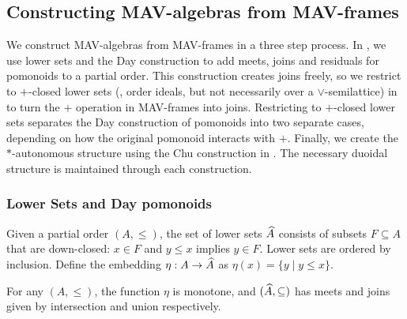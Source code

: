 \subsection{Constructing MAV-algebras from MAV-frames}

We construct MAV-algebras from MAV-frames in a three step process. In
, we use lower sets and the Day construction to
add meets, joins and residuals for pomonoids to a partial order. This
construction creates joins freely, so we restrict to $+$-closed lower
sets (\ie, order ideals, but not necessarily over a
$\lor$-semilattice) in  to turn the $+$
operation in MAV-frames into joins. Restricting to $+$-closed lower
sets separates the Day construction of pomonoids into two separate
cases, depending on how the original pomonoid interacts with
$+$. Finally, we create the $*$-autonomous structure using the Chu
construction in . The necessary duoidal structure is
maintained through each construction.

\subsubsection{Lower Sets and Day pomonoids}
\label{sec:lower-sets}

\begin{definition}
  Given a partial order $(A, \leq)$, the set of lower sets
  $\widehat{A}$ consists of subsets $F \subseteq A$ that are
  down-closed: $x \in F$ and $y \leq x$ implies $y \in F$. Lower sets
  are ordered by inclusion. Define the embedding
  $\eta : A \to \widehat{A}$ as $\eta(x) = \{ y \mid y \leq x \}$.
\end{definition}

\begin{proposition}
  For any $(A, \leq)$, the function $\eta$ is monotone, and
  $(\widehat{A}, \subseteq)$ has meets and joins given by
  intersection and union respectively.
\end{proposition}


